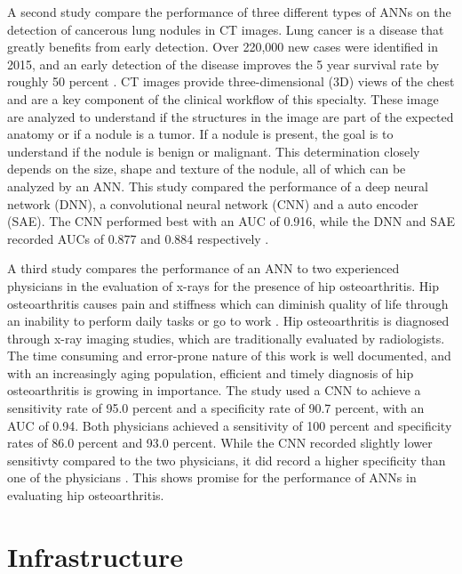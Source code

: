 \documentclass[sigconf]{acmart}
\begin{document}
A second study compare the performance of three different types of ANNs on the detection of cancerous lung nodules  in CT images. Lung cancer is a disease that greatly benefits from early detection. Over 220,000 new cases were identified in 2015, and an early detection of the disease improves the 5 year survival rate by roughly 50 percent \cite{cite10}. CT images provide three-dimensional (3D) views of the chest and are a key component of the clinical workflow of this specialty. These image are analyzed to understand if the structures in the image are part of the expected anatomy or if a nodule is a tumor. If a nodule is present, the goal is to understand if the nodule is benign or malignant. This determination closely depends on the size, shape and texture of the nodule, all of which can be analyzed by an ANN. This study compared the performance of a deep neural network (DNN), a convolutional neural network (CNN) and a auto encoder (SAE). The CNN performed best with an AUC of 0.916, while the DNN and SAE recorded AUCs of 0.877 and 0.884 respectively \cite{cite10}.

A third study compares the performance of an ANN to two experienced physicians in the evaluation of x-rays for the presence of hip osteoarthritis. Hip osteoarthritis causes pain and stiffness which can diminish quality of life through an inability to perform daily tasks or go to work \cite{cite12}. Hip osteoarthritis is diagnosed through x-ray imaging studies, which are traditionally evaluated by radiologists. The time consuming and error-prone nature of this work is well documented, and with an increasingly aging population, efficient and timely diagnosis of hip osteoarthritis is growing in importance. The study used a CNN to achieve a sensitivity rate of 95.0 percent and a specificity rate of 90.7 percent, with an AUC of 0.94. Both physicians achieved a sensitivity of 100 percent and specificity rates of 86.0 percent and 93.0 percent. While the CNN recorded slightly lower sensitivty compared to the two physicians, it did record a higher specificity than one of the physicians \cite{cite12}. This shows promise for the performance of ANNs in evaluating hip osteoarthritis.

\section{Infrastructure}
\end{document}
